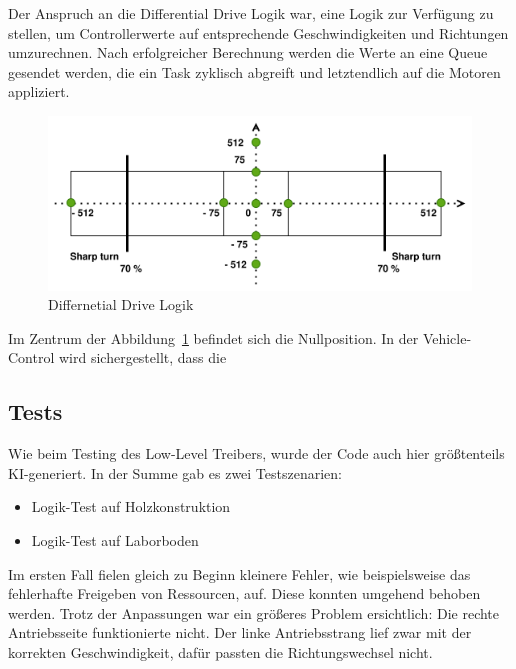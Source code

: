 Der Anspruch an die Differential Drive Logik war, eine Logik zur Verfügung zu stellen, um Controllerwerte auf entsprechende Geschwindigkeiten und Richtungen umzurechnen. Nach erfolgreicher Berechnung werden die Werte an eine Queue gesendet werden, die ein Task zyklisch abgreift und letztendlich auf die Motoren appliziert.

\begin{figure}[h]
    \centering
    \includegraphics[width=\textwidth]{images/diff_drive_logic.png}
    \caption{Differnetial Drive Logik}
    \label{fig:diff_drive_logic}
\end{figure}

Im Zentrum der Abbildung~\ref{fig:diff_drive_logic} befindet sich die Nullposition. In der Vehicle-Control wird sichergestellt, dass die 

\subsection{Tests} \label{sec:diff_drive_tests}

Wie beim Testing des Low-Level Treibers, wurde der Code auch hier größtenteils KI-generiert. In der Summe gab es zwei Testszenarien:

\begin{itemize}
    \item Logik-Test auf Holzkonstruktion
    \item Logik-Test auf Laborboden
\end{itemize}

Im ersten Fall fielen gleich zu Beginn kleinere Fehler, wie beispielsweise das fehlerhafte Freigeben von Ressourcen, auf. Diese konnten umgehend behoben werden. Trotz der Anpassungen war ein größeres Problem ersichtlich: Die rechte Antriebsseite funktionierte nicht. Der linke Antriebsstrang lief zwar mit der korrekten Geschwindigkeit, dafür passten die Richtungswechsel nicht. \newline

